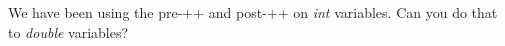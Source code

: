  We have been using the pre-++ and post-++ on \textit{int} variables. Can you do that to \emph{double} variables?

